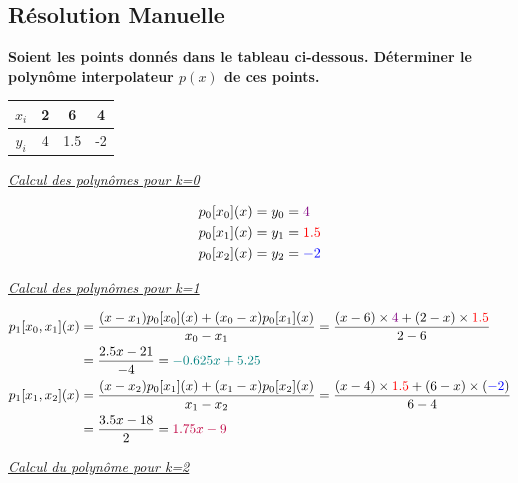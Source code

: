 \subsection{Résolution Manuelle}
\begin{center}
    \textbf{Soient les points donnés dans le tableau ci-dessous. Déterminer le polynôme interpolateur $p(x)$ de ces points.}\vspace{6pt}\\
\begin{tabular}{|c|c|c|c|}
    \hline
    $x_i$ & 2 & 6 & 4 \\
    \hline
    $y_i$ & 4 & 1.5 & -2\\
    \hline
\end{tabular}
\end{center}
\underline{\textit{Calcul des polynômes pour k=0}}\\
\begin{center}
    \begin{align*}
        p_0[x_0](x)&=y_0=\textcolor{violet}{4}\vspace{4pt}\\
        p_0[x_1](x)&=y_1=\textcolor{red}{1.5}\vspace{4pt}\\
        p_0[x_2](x)&=y_2=\textcolor{blue}{-2}\vspace{4pt}\\
    \end{align*}
\end{center}
\underline{\textit{Calcul des polynômes pour k=1}}\\
\begin{center}
    \begin{align*}
        p_1[x_0, x_1](x)&=\frac{(x-x_1)p_0[x_0](x)+(x_0-x)p_0[x_1](x)}{x_0-x_1}=\frac{(x-6)\times\textcolor{violet}{4}+(2-x)\times\textcolor{red}{1.5}}{2-6}\\&=\frac{2.5x-21}{-4}=\textcolor{teal}{-0.625x+5.25}\vspace{4pt}\\
        p_1[x_1, x_2](x)&=\frac{(x-x_2)p_0[x_1](x)+(x_1-x)p_0[x_2](x)}{x_1-x_2}=\frac{(x-4)\times \textcolor{red}{1.5}+(6-x)\times(\textcolor{blue}{-2})}{6-4}\\&=\frac{3.5x-18}{2}=\textcolor{purple}{1.75x-9}\vspace{4pt}\\
    \end{align*}
\end{center}
\underline{\textit{Calcul du polynôme pour k=2}}\\
